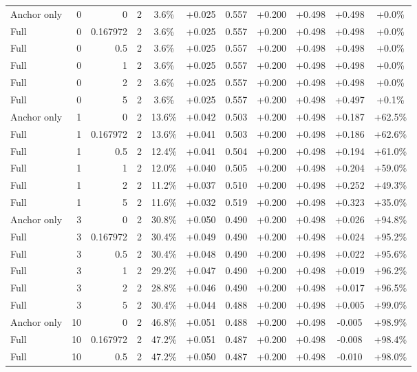 \begin{table}[htbp]
\begin{tabular}{lrrrccccccc}
Anchor only & 0 & 0 & 2 & 3.6\% & +0.025 & 0.557 & +0.200 & +0.498 & +0.498 & +0.0\% \\
Full & 0 & 0.167972 & 2 & 3.6\% & +0.025 & 0.557 & +0.200 & +0.498 & +0.498 & +0.0\% \\
Full & 0 & 0.5 & 2 & 3.6\% & +0.025 & 0.557 & +0.200 & +0.498 & +0.498 & +0.0\% \\
Full & 0 & 1 & 2 & 3.6\% & +0.025 & 0.557 & +0.200 & +0.498 & +0.498 & +0.0\% \\
Full & 0 & 2 & 2 & 3.6\% & +0.025 & 0.557 & +0.200 & +0.498 & +0.498 & +0.0\% \\
Full & 0 & 5 & 2 & 3.6\% & +0.025 & 0.557 & +0.200 & +0.498 & +0.497 & +0.1\% \\
Anchor only & 1 & 0 & 2 & 13.6\% & +0.042 & 0.503 & +0.200 & +0.498 & +0.187 & +62.5\% \\
Full & 1 & 0.167972 & 2 & 13.6\% & +0.041 & 0.503 & +0.200 & +0.498 & +0.186 & +62.6\% \\
Full & 1 & 0.5 & 2 & 12.4\% & +0.041 & 0.504 & +0.200 & +0.498 & +0.194 & +61.0\% \\
Full & 1 & 1 & 2 & 12.0\% & +0.040 & 0.505 & +0.200 & +0.498 & +0.204 & +59.0\% \\
Full & 1 & 2 & 2 & 11.2\% & +0.037 & 0.510 & +0.200 & +0.498 & +0.252 & +49.3\% \\
Full & 1 & 5 & 2 & 11.6\% & +0.032 & 0.519 & +0.200 & +0.498 & +0.323 & +35.0\% \\
Anchor only & 3 & 0 & 2 & 30.8\% & +0.050 & 0.490 & +0.200 & +0.498 & +0.026 & +94.8\% \\
Full & 3 & 0.167972 & 2 & 30.4\% & +0.049 & 0.490 & +0.200 & +0.498 & +0.024 & +95.2\% \\
Full & 3 & 0.5 & 2 & 30.4\% & +0.048 & 0.490 & +0.200 & +0.498 & +0.022 & +95.6\% \\
Full & 3 & 1 & 2 & 29.2\% & +0.047 & 0.490 & +0.200 & +0.498 & +0.019 & +96.2\% \\
Full & 3 & 2 & 2 & 28.8\% & +0.046 & 0.490 & +0.200 & +0.498 & +0.017 & +96.5\% \\
Full & 3 & 5 & 2 & 30.4\% & +0.044 & 0.488 & +0.200 & +0.498 & +0.005 & +99.0\% \\
Anchor only & 10 & 0 & 2 & 46.8\% & +0.051 & 0.488 & +0.200 & +0.498 & -0.005 & +98.9\% \\
Full & 10 & 0.167972 & 2 & 47.2\% & +0.051 & 0.487 & +0.200 & +0.498 & -0.008 & +98.4\% \\
Full & 10 & 0.5 & 2 & 47.2\% & +0.050 & 0.487 & +0.200 & +0.498 & -0.010 & +98.0\% \\

\end{tabular}
\end{table}
